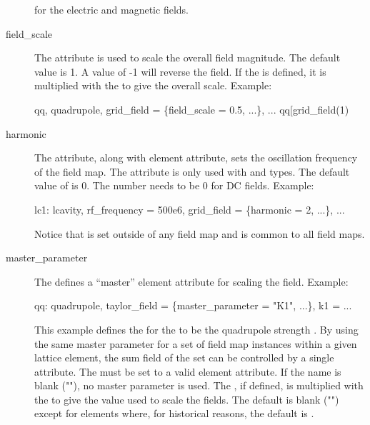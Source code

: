 \begin{description}
for the electric and magnetic fields.
  \item[field_scale] \Newline
The  attribute is used to scale the overall field magnitude. The default
value is 1. A value of -1 will reverse the field. If the  is
defined, it is multiplied with the  to give the overall scale.
Example:
\begin{example}
  qq, quadrupole, grid_field = \{field_scale = 0.5, ...\}, ...
  qq[grid_field(1)%
\end{example}
  \item[harmonic] \Newline
The  attribute, along with  element attribute, sets the oscillation
frequency of the field map. The  attribute is only used with  and
 types. The default value of  is 0.  The  number needs to
be 0 for DC fields. Example:
\begin{example}
  lc1: lcavity, rf_frequency = 500e6, grid_field = \{harmonic = 2, ...\}, ...
\end{example}
Notice that  is set outside of any field map and is common to all field maps.
  \item[master_parameter] \Newline
The  defines a ``master'' element attribute for scaling the field. Example:
\begin{example}
  qq: quadrupole, taylor_field = \{master_parameter = "K1", ...\}, k1 = ...
\end{example}
This example defines the  for the  to be the
quadrupole strength . By using the same master parameter for a set of field map
instances within a given lattice element, the sum field of the set can be controlled by a
single attribute. The  must be set to a valid element attribute. If
the name is blank (""), no master parameter is used. The , if
defined, is multiplied with the  to give the value used to scale the
fields. The default  is blank ("") except for  elements
where, for historical reasons, the default is .


\end{description}
